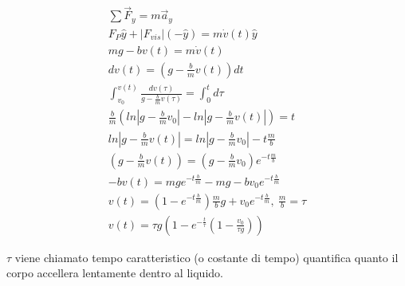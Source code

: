 \documentclass{article}
\numberwithin{equation}{subsection}
\begin{document}
\begin{center}\end{center}
 
\begin{gather}
    \sum\vec{F}_y=m\vec{a}_y\\
    F_P\hat{y}+\left|F_{vis}\right|(-\hat{y})=m\dot v(t)\hat{y}\\
    mg-bv(t)=m\dot v(t)\\
    dv(t)=(g-\displaystyle\frac{b}{m}v(t))dt\\
    \displaystyle\int_{v_0}^{v(t)}\frac{dv(\tau)}{g-\displaystyle\frac{b}{m}v(\tau)}=\int_{0}^{t}d\tau\\
    \displaystyle\frac{b}{m}\left(ln\left|g-\displaystyle\frac{b}{m} v_0\right|-ln\left|g-\displaystyle\frac{b}{m} v(t)\right|\right)=t\\
    \displaystyle ln\left|g-\displaystyle\frac{b}{m}v(t)\right|=ln\left|g-\displaystyle\frac{b}{m} v_0\right|-t\frac{m}{b}\\
    (g-\displaystyle\frac{b}{m} v(t))=(g-\frac{b}{m}v_0)e^{\displaystyle -t\frac{m}{b}}\\
    -bv(t)=mge^{\displaystyle -t\frac{b}{m}}-mg-bv_0e^{\displaystyle -t\frac{b}{m}}\\
    v(t)=\left(1-e^{\displaystyle -t\frac{b}{m}}\right)\displaystyle\frac{m}{b}g+v_0e^{\displaystyle -t\frac{b}{m}},\:\frac{m}{b}=\tau\\
    v(t)=\tau g\left(1-e^{\displaystyle -\frac{t}{\tau}}\left(1-\displaystyle\frac{v_0}{\tau g}\right)\right)
\end{gather}

$\tau$ viene chiamato tempo caratteristico (o costante di tempo) 
quantifica quanto il corpo accellera lentamente dentro al liquido. 
\end{document}

